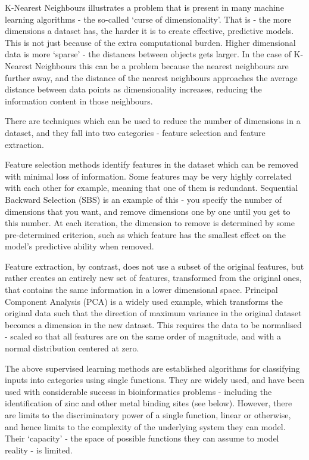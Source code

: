 K-Nearest Neighbours illustrates a problem that is present in many machine learning algorithms - the so-called `curse of dimensionality'. That is - the more dimensions a dataset has, the harder it is to create effective, predictive models. This is not just because of the extra computational burden. Higher dimensional data is more `sparse' - the distances between objects gets larger. In the case of K-Nearest Neighbours this can be a problem because the nearest neighbours are further away, and the distance of the nearest neighbours approaches the average distance between data points as dimensionality increases, reducing the information content in those neighbours.

There are techniques which can be used to reduce the number of dimensions in a dataset, and they fall into two categories - feature selection and feature extraction.

Feature selection methods identify features in the dataset which can be removed with minimal loss of information. Some features may be very highly correlated with each other for example, meaning that one of them is redundant. Sequential Backward Selection (SBS) is an example of this - you specify the number of dimensions that you want, and remove dimensions one by one until you get to this number. At each iteration, the dimension to remove is determined by some pre-determined criterion, such as which feature has the smallest effect on the model's predictive ability when removed.


Feature extraction, by contrast, does not use a subset of the original features, but rather creates an entirely new set of features, transformed from the original ones, that contains the same information in a lower dimensional space. Principal Component Analysis (PCA) is a widely used example, which transforms the original data such that the direction of maximum variance in the original dataset becomes a dimension in the new dataset. This requires the data to be normalised - scaled so that all features are on the same order of magnitude, and with a normal distribution centered at zero. 

The above supervised learning methods are established algorithms for classifying inputs into categories using single functions. They are widely used, and have been used with considerable success in bioinformatics problems - including the identification of zinc and other metal binding sites (see below). However, there are limits to the discriminatory power of a single function, linear or otherwise, and hence limits to the complexity of the underlying system they can model. Their `capacity' - the space of possible functions they can assume to model reality - is limited.

